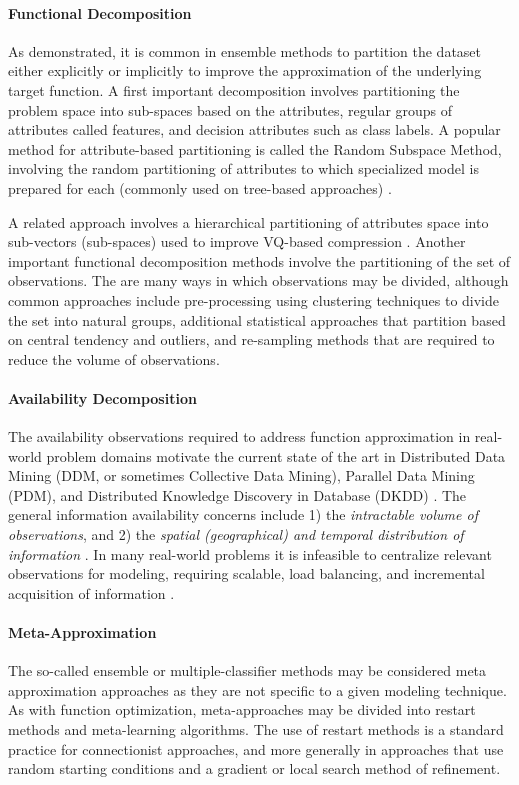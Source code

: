 \paragraph{Functional Decomposition}
As demonstrated, it is common in ensemble methods to partition the dataset either explicitly or implicitly to improve the approximation of the underlying target function. A first important decomposition involves partitioning the problem space into sub-spaces based on the attributes, regular groups of attributes called features, and decision attributes such as class labels. A popular method for attribute-based partitioning is called the Random Subspace Method, involving the random partitioning of attributes to which specialized model is prepared for each (commonly used on tree-based approaches) \cite{Ho1998}. 

A related approach involves a hierarchical partitioning of attributes space into sub-vectors (sub-spaces) used to improve VQ-based compression \cite{Gersho1984}. Another important functional decomposition methods involve the partitioning of the set of observations. The are many ways in which observations may be divided, although common approaches include pre-processing using clustering techniques to divide the set into natural groups, additional statistical approaches that partition based on central tendency and outliers, and re-sampling methods that are required to reduce the volume of observations.
	
\paragraph{Availability Decomposition}
The availability observations required to address function approximation in real-world problem domains motivate the current state of the art in Distributed Data Mining (DDM, or sometimes Collective Data Mining), Parallel Data Mining (PDM), and Distributed Knowledge Discovery in Database (DKDD) \cite{Kargupta2000}. The general information availability concerns include 1) the \emph{intractable volume of observations}, and 2) the \emph{spatial (geographical) and temporal distribution of information} \cite{Zaki1999}. In many real-world problems it is infeasible to centralize relevant observations for modeling, requiring scalable, load balancing, and incremental acquisition of information \cite{Skillicorn1999}. 
	
\paragraph{Meta-Approximation}
The so-called ensemble or multiple-classifier methods may be considered meta approximation approaches as they are not specific to a given modeling technique. As with function optimization, meta-approaches may be divided into restart methods and meta-learning algorithms. The use of restart methods is a standard practice for connectionist approaches, and more generally in approaches that use random starting conditions and a gradient or local search method of refinement. 


